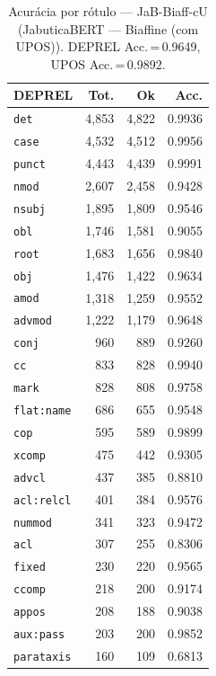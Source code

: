 \begin{table}[ht]
\centering
\caption{Acurácia por rótulo --- JaB-Biaff-cU (JabuticaBERT — Biaffine (com UPOS)). DEPREL Acc.\,=\,0.9649, UPOS Acc.\,=\,0.9892.}
\label{tab:acc-predict-test-df-jabuticabert-biaffine}
\begin{minipage}[t]{0.55\linewidth}
\centering\scriptsize
\begin{tabular}{lrrr}
\toprule
\textbf{DEPREL} & \textbf{Tot.} & \textbf{Ok} & \textbf{Acc.} \\
\midrule
\texttt{det} & 4,853 & 4,822 & 0.9936 \\
\texttt{case} & 4,532 & 4,512 & 0.9956 \\
\texttt{punct} & 4,443 & 4,439 & 0.9991 \\
\texttt{nmod} & 2,607 & 2,458 & 0.9428 \\
\texttt{nsubj} & 1,895 & 1,809 & 0.9546 \\
\texttt{obl} & 1,746 & 1,581 & 0.9055 \\
\texttt{root} & 1,683 & 1,656 & 0.9840 \\
\texttt{obj} & 1,476 & 1,422 & 0.9634 \\
\texttt{amod} & 1,318 & 1,259 & 0.9552 \\
\texttt{advmod} & 1,222 & 1,179 & 0.9648 \\
\texttt{conj} & 960 & 889 & 0.9260 \\
\texttt{cc} & 833 & 828 & 0.9940 \\
\texttt{mark} & 828 & 808 & 0.9758 \\
\texttt{flat\!:\!name} & 686 & 655 & 0.9548 \\
\texttt{cop} & 595 & 589 & 0.9899 \\
\texttt{xcomp} & 475 & 442 & 0.9305 \\
\texttt{advcl} & 437 & 385 & 0.8810 \\
\texttt{acl\!:\!relcl} & 401 & 384 & 0.9576 \\
\texttt{nummod} & 341 & 323 & 0.9472 \\
\texttt{acl} & 307 & 255 & 0.8306 \\
\texttt{fixed} & 230 & 220 & 0.9565 \\
\texttt{ccomp} & 218 & 200 & 0.9174 \\
\texttt{appos} & 208 & 188 & 0.9038 \\
\texttt{aux\!:\!pass} & 203 & 200 & 0.9852 \\
\texttt{parataxis} & 160 & 109 & 0.6813 \\

\end{tabular}
\end{minipage}
\end{table}
